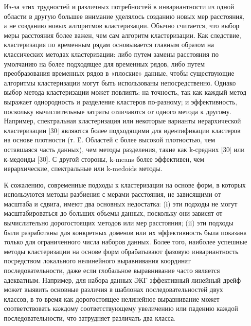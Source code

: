 Из-за этих трудностей и различных потребностей в инвариантности из одной 
области в другую большее внимание уделялось созданию новых мер расстояния, а не созданию новых алгоритмов кластеризации. 
Обычно считается, что выбор меры расстояния более важен, чем сам алгоритм кластеризации. 
Как следствие, кластеризация по временным рядам основывается главным образом на классических методах кластеризации: 
либо путем замены расстояния по умолчанию на более подходящее для временных рядов, 
либо путем преобразования временных рядов в «плоские» данные, чтобы существующие алгоритмы кластеризации 
могут быть использованы непосредственно. Однако выбор метода кластеризации может повлиять: 
на точность, так как каждый метод выражает однородность и разделение кластеров по-разному; и эффективность, 
поскольку вычислительные затраты отличаются от одного метода к другому. Например, спектральная кластеризация 
или некоторые варианты иерархической кластеризации [30] являются более подходящими для идентификации кластеров 
на основе плотности (т. Е. Областей с более высокой плотностью, чем оставшаяся часть данных), 
чем методы разделения, такие как k-средних [30] или к-медоиды [30]. С другой стороны, k-means более эффективен,
чем иерархические, спектральные или k-medoids методы. 

К сожалению, современные подходы к кластеризации на основе форм,
в которых используются методы разбиения с мерами расстояния, не зависящими от масштаба и сдвига, имеют два основных недостатка:
(i) эти подходы не могут масштабироваться до больших объемы данных, поскольку они зависят 
от вычислительно дорогостоящих методов или мер расстояния; 
(ii) эти подходы были разработаны для конкретных доменов или их эффективность была
показана только для ограниченного числа наборов данных. 
Более того, наиболее успешные методы кластеризации на основе форм обрабатывают 
фазовую инвариантность посредством локального нелинейного выравнивания координат 
последовательности, даже если глобальное выравнивание часто является адекватным. 
Например, для набора данных ЭКГ эффективный линейный дрейф может выявить 
основные различия в шаблонах последовательностей двух классов, 
в то время как дорогостоящее нелинейное выравнивание может соответствовать 
каждому соответствующему увеличению или падению каждой последовательности, 
что затрудняет различать два класса. 

